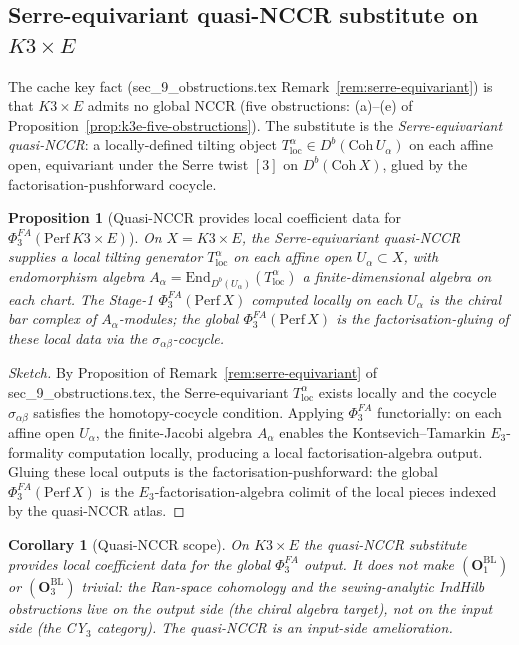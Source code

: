 \documentclass[11pt]{amsart}
\newtheorem{proposition}[theorem]{Proposition}
\newtheorem{corollary}[theorem]{Corollary}
\newcommand{\Perf}{\mathrm{Perf}}
\newcommand{\Coh}{\mathrm{Coh}}
\newcommand{\End}{\mathrm{End}}
\begin{document}
\subsection{Serre-equivariant quasi-NCCR substitute on $K3\times E$}

The cache key fact (sec\_9\_obstructions.tex
Remark~\ref{rem:serre-equivariant}) is that $K3\times E$ admits no
global NCCR (five obstructions: (a)--(e) of
Proposition~\ref{prop:k3e-five-obstructions}). The substitute is
the \emph{Serre-equivariant quasi-NCCR}: a locally-defined
tilting object $T_{\mathrm{loc}}^\alpha \in D^b(\Coh\,U_\alpha)$ on
each affine open, equivariant under the Serre twist $[3]$ on
$D^b(\Coh\,X)$, glued by the factorisation-pushforward cocycle.

\begin{proposition}[Quasi-NCCR provides local coefficient data
for $\Phi^{FA}_3(\Perf\,K3\times E)$]
\label{prop:quasi-nccr-local-data}
On $X = K3 \times E$, the Serre-equivariant quasi-NCCR supplies a
local tilting generator $T_{\mathrm{loc}}^\alpha$ on each affine
open $U_\alpha \subset X$, with endomorphism algebra
$A_\alpha = \End_{D^b(U_\alpha)}(T_{\mathrm{loc}}^\alpha)$ a
finite-dimensional algebra on each chart. The Stage-1
$\Phi^{FA}_3(\Perf\,X)$ computed locally on each $U_\alpha$ is the
chiral bar complex of $A_\alpha$-modules; the global
$\Phi^{FA}_3(\Perf\,X)$ is the factorisation-gluing of these local
data via the $\sigma_{\alpha\beta}$-cocycle.
\end{proposition}

\begin{proof}[Sketch]
By Proposition of Remark~\ref{rem:serre-equivariant} of
sec\_9\_obstructions.tex, the Serre-equivariant
$T_{\mathrm{loc}}^\alpha$ exists locally and the cocycle
$\sigma_{\alpha\beta}$ satisfies the homotopy-cocycle condition.
Applying $\Phi^{FA}_3$ functorially: on each affine open
$U_\alpha$, the finite-Jacobi algebra $A_\alpha$ enables the
Kontsevich--Tamarkin $E_3$-formality computation locally, producing
a local factorisation-algebra output. Gluing these local outputs
is the factorisation-pushforward: the global
$\Phi^{FA}_3(\Perf\,X)$ is the $E_3$-factorisation-algebra colimit
of the local pieces indexed by the quasi-NCCR atlas.
\end{proof}

\begin{corollary}[Quasi-NCCR scope]
\label{cor:quasi-nccr-scope}
On $K3 \times E$ the quasi-NCCR substitute provides local
coefficient data for the global $\Phi^{FA}_3$ output. It does
\emph{not} make $(\mathbf{O}_1^{\mathrm{BL}})$ or
$(\mathbf{O}_3^{\mathrm{BL}})$ trivial: the Ran-space cohomology
and the sewing-analytic IndHilb obstructions live on the
output side (the chiral algebra target), not on the input side
(the CY$_3$ category). The quasi-NCCR is an input-side
amelioration.
\end{corollary}
\end{document}
